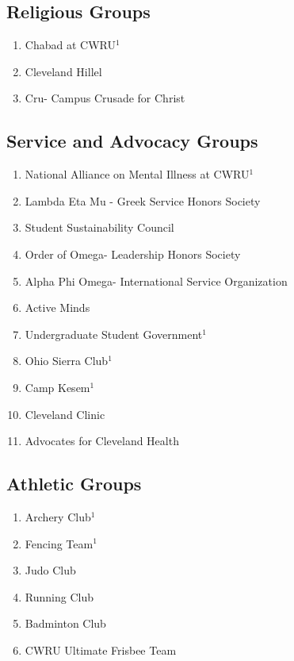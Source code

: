     \subsection*{Religious Groups}
      \begin{enumerate}
       \item Chabad at CWRU$^1$
       \item Cleveland Hillel
       \item Cru- Campus Crusade for Christ
      \end{enumerate}
      
    \subsection*{Service and Advocacy Groups}
      \begin{enumerate}
	\item National Alliance on Mental Illness at CWRU$^1$
	\item Lambda Eta Mu - Greek Service Honors Society
	\item Student Sustainability Council
	\item Order of Omega- Leadership Honors Society
	\item Alpha Phi Omega- International Service Organization
	\item Active Minds
	\item Undergraduate Student Government$^1$
	\item Ohio Sierra Club$^1$
	\item Camp Kesem$^1$
	\item Cleveland Clinic
	\item Advocates for Cleveland Health
      \end{enumerate}
      
    \subsection*{Athletic Groups}
      \begin{enumerate}
       \item Archery Club$^1$
       \item Fencing Team$^1$
       \item Judo Club
       \item Running Club
       \item Badminton Club
       \item CWRU Ultimate Frisbee Team
      \end{enumerate}
      
